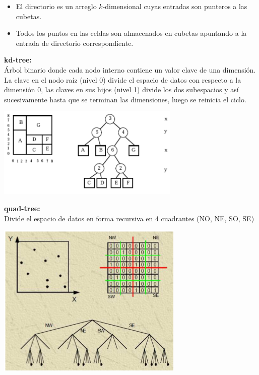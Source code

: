 \documentclass[a4paper,12pt,oneside]{report}
\begin{document}
\begin{itemize}
\item El directorio es un arreglo $k$-dimensional cuyas entradas son punteros a las cubetas.
\item Todos los puntos en las celdas son almacenados en cubetas apuntando a la entrada de directorio correspondiente.
\end{itemize} 
\noindent \textbf{kd-tree:}\\
\'Arbol binario donde cada nodo interno contiene un valor clave de una dimensi\'on. La clave en el nodo ra\'iz (nivel 0) divide el espacio de datos con respecto a la dimensi\'on 0, las claves en sus hijos (nivel 1) divide los dos subespacios y as\'i sucesivamente hasta que se terminan las dimensiones, luego se reinicia el ciclo.\\
\begin{center}
\includegraphics[scale=0.5]{Imagenes/10.png}
\end{center}

\noindent \textbf{quad-tree:}\\
Divide el espacio de datos en forma recursiva en 4 cuadrantes (NO, NE, SO, SE)\\
\begin{center} \includegraphics[scale=0.5]{Imagenes/11.png} \end{center}
\end{document}
